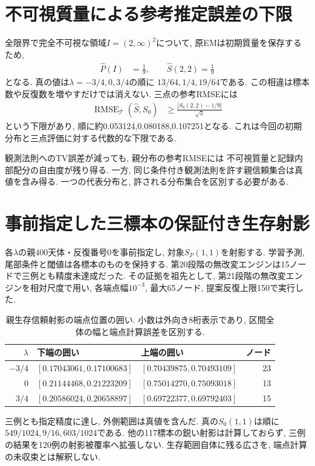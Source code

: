 \section{不可視質量による参考推定誤差の下限}
\label{sec:stage22_nonidentification}

全限界で完全不可視な領域$I=(2,\infty)^2$について,
原EMは初期質量を保存するため,
\begin{align}
\widehat P(I)&=\frac19,\qquad \widehat S(2,2)=\frac19
\label{eq:stage22_invisible_initialization}
\end{align}
となる. 真の値は$\lambda=-3/4,0,3/4$の順に
$13/64,1/4,19/64$である.
この相違は標本数や反復数を増やすだけでは消えない.
三点の参考RMSEには
\begin{align}
\operatorname{RMSE}_{\mathcal T}(\widehat S,S_0)
&\ge\frac{|S_0(2,2)-1/9|}{\sqrt3}
\label{eq:stage22_rmse_floor}
\end{align}
という下限があり, 順に約0.053124,0.080188,0.107251となる.
これは今回の初期分布と三点評価に対する代数的な下限である.

観測法則へのTV誤差が減っても, 親分布の参考RMSEには
不可視質量と記録内部配分の自由度が残り得る.
一方, 同じ条件付き観測法則を許す親信頼集合は真値を含み得る.
一つの代表分布と, 許される分布集合を区別する必要がある.

\section{事前指定した三標本の保証付き生存射影}
\label{sec:stage22_projection}

各$\lambda$の親400天体・反復番号0を事前指定し,
対象$S_P(1,1)$を射影する.
学習予測, 尾部条件と閾値は各標本のものを保持する.
第20段階の無改変エンジンは15ノードで三例とも精度未達成だった.
その証拠を祖先として, 第21段階の無改変エンジンを相対尺度で用い,
各端点幅$10^{-3}$, 最大65ノード, 提案反復上限150で実行した.

\begin{table}[htbp]
\centering
\caption{親生存信頼射影の端点位置の囲い.
小数は外向き8桁表示であり, 区間全体の幅と端点計算誤差を区別する.}
\label{tab:stage22_projection}
\small
\begin{tabular}{rllr}
\toprule
$\lambda$ & 下端の囲い & 上端の囲い & ノード \\
\midrule
$-3/4$ & $[0.17043061,0.17100683]$ & $[0.70439875,0.70493109]$ & 23 \\
$0$ & $[0.21144468,0.21223209]$ & $[0.75014270,0.75093018]$ & 13 \\
$3/4$ & $[0.20586024,0.20658897]$ & $[0.69722377,0.69792403]$ & 15 \\
\bottomrule
\end{tabular}
\end{table}
三例とも指定精度に達し, 外側範囲は真値を含んだ.
真の$S_0(1,1)$は順に$549/1024,9/16,603/1024$である.
他の117標本の鋭い射影は計算しておらず,
三例の結果を120例の射影被覆率へ拡張しない.
生存範囲自体に残る広さを, 端点計算の未収束とは解釈しない.

